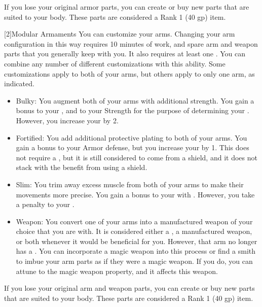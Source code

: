       If you lose your original armor parts, you can create or buy new parts that are suited to your body.
      These parts are considered a Rank 1 (40 gp) item.

    [2]{Modular Armaments} You can customize your arms.
      Changing your arm configuration in this way requires 10 minutes of work, and spare arm and weapon parts that you generally keep with you.
      It also requires at least one .
      You can combine any number of different customizations with this ability.
      Some customizations apply to both of your arms, but others apply to only one arm, as indicated.
      \begin{itemize}
        \item Bulky: You augment both of your arms with additional strength.
          You gain a  bonus to your , and to your Strength for the purpose of determining your .
          However, you increase your  by 2.
        \item Fortified: You add additional protective plating to both of your arms.
          You gain a  bonus to your Armor defense, but you increase your  by 1.
          This does not require a , but it is still considered to come from a shield, and it does not stack with the benefit from using a shield.
        \item Slim: You trim away excess muscle from both of your arms to make their movements more precise.
          You gain a  bonus to your  with .
          However, you take a  penalty to your .
        \item Weapon: You convert one of your arms into a manufactured weapon of your choice that you are  with.
          It is considered either a , a manufactured weapon, or both whenever it would be beneficial for you.
          However, that arm no longer has a .
          You can incorporate a magic weapon into this process or find a smith to imbue your arm parts as if they were a magic weapon.
          If you do, you can attune to the magic weapon property, and it affects this weapon.
      \end{itemize}

      If you lose your original arm and weapon parts, you can create or buy new parts that are suited to your body.
      These parts are considered a Rank 1 (40 gp) item.

